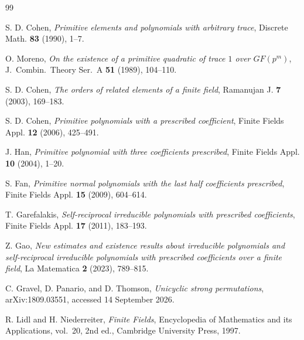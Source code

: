 \documentclass[11pt]{article}
\theoremstyle{definition}
\theoremstyle{remark}
\begin{document}
\begin{thebibliography}{99}

S. D. Cohen,
\emph{Primitive elements and polynomials with arbitrary trace},
Discrete Math. \textbf{83} (1990), 1--7.

O. Moreno,
\emph{On the existence of a primitive quadratic of trace $1$ over $GF(p^m)$},
J.~Combin.~Theory Ser.~A \textbf{51} (1989), 104--110.

S. D. Cohen,
\emph{The orders of related elements of a finite field},
Ramanujan J. \textbf{7} (2003), 169--183.

S. D. Cohen,
\emph{Primitive polynomials with a prescribed coefficient},
Finite Fields Appl. \textbf{12} (2006), 425--491.

J. Han,
\emph{Primitive polynomial with three coefficients prescribed},
Finite Fields Appl. \textbf{10} (2004), 1--20.

S. Fan,
\emph{Primitive normal polynomials with the last half coefficients prescribed},
Finite Fields Appl. \textbf{15} (2009), 604--614.

T. Garefalakis,
\emph{Self-reciprocal irreducible polynomials with prescribed coefficients},
Finite Fields Appl. \textbf{17} (2011), 183--193.

Z. Gao,
\emph{New estimates and existence results about irreducible polynomials and self-reciprocal irreducible polynomials with prescribed coefficients over a finite field},
La Matematica \textbf{2} (2023), 789--815.

C. Gravel, D. Panario, and D. Thomson,
\emph{Unicyclic strong permutations},
arXiv:1809.03551, accessed 14 September 2026.

R. Lidl and H. Niederreiter,
\emph{Finite Fields},
Encyclopedia of Mathematics and its Applications, vol.~20, 2nd ed., Cambridge University Press, 1997.

\end{thebibliography}
\end{document}
